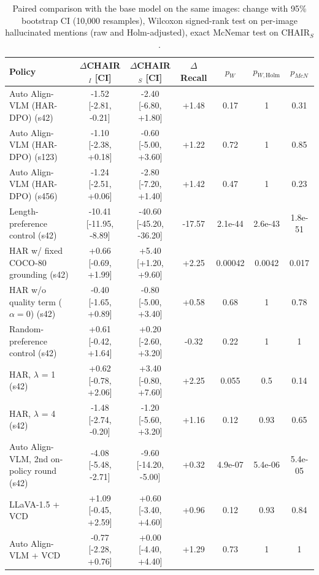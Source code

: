 \begin{table}[t]
\centering
\small
\caption{Paired comparison with the base model on the same images: change with 95\% bootstrap CI (10,000 resamples), Wilcoxon signed-rank test on per-image hallucinated mentions (raw and Holm-adjusted), exact McNemar test on CHAIR$_S$.}
\label{tab:tests}
\begin{tabular}{lcccccc}
\toprule
Policy & $\Delta$CHAIR$_I$ [CI] & $\Delta$CHAIR$_S$ [CI] & $\Delta$Recall & $p_W$ & $p_{W,\mathrm{Holm}}$ & $p_{McN}$ \\
\midrule
Auto Align-VLM (HAR-DPO) (s42) & -1.52 [-2.81, -0.21] & -2.40 [-6.80, +1.80] & +1.48 & 0.17 & 1 & 0.31 \\
Auto Align-VLM (HAR-DPO) (s123) & -1.10 [-2.38, +0.18] & -0.60 [-5.00, +3.60] & +1.22 & 0.72 & 1 & 0.85 \\
Auto Align-VLM (HAR-DPO) (s456) & -1.24 [-2.51, +0.06] & -2.80 [-7.20, +1.40] & +1.42 & 0.47 & 1 & 0.23 \\
Length-preference control (s42) & -10.41 [-11.95, -8.89] & -40.60 [-45.20, -36.20] & -17.57 & 2.1e-44 & 2.6e-43 & 1.8e-51 \\
HAR w/ fixed COCO-80 grounding (s42) & +0.66 [-0.69, +1.99] & +5.40 [+1.20, +9.60] & +2.25 & 0.00042 & 0.0042 & 0.017 \\
HAR w/o quality term ($\alpha{=}0$) (s42) & -0.40 [-1.65, +0.89] & -0.80 [-5.00, +3.40] & +0.58 & 0.68 & 1 & 0.78 \\
Random-preference control (s42) & +0.61 [-0.42, +1.64] & +0.20 [-2.60, +3.20] & -0.32 & 0.22 & 1 & 1 \\
HAR, $\lambda$ = 1 (s42) & +0.62 [-0.78, +2.06] & +3.40 [-0.80, +7.60] & +2.25 & 0.055 & 0.5 & 0.14 \\
HAR, $\lambda$ = 4 (s42) & -1.48 [-2.74, -0.20] & -1.20 [-5.60, +3.20] & +1.16 & 0.12 & 0.93 & 0.65 \\
Auto Align-VLM, 2nd on-policy round (s42) & -4.08 [-5.48, -2.71] & -9.60 [-14.20, -5.00] & +0.32 & 4.9e-07 & 5.4e-06 & 5.4e-05 \\
LLaVA-1.5 + VCD & +1.09 [-0.45, +2.59] & +0.60 [-3.40, +4.60] & +0.96 & 0.12 & 0.93 & 0.84 \\
Auto Align-VLM + VCD & -0.77 [-2.28, +0.76] & +0.00 [-4.40, +4.40] & +1.29 & 0.73 & 1 & 1 \\
\bottomrule
\end{tabular}
\end{table}
